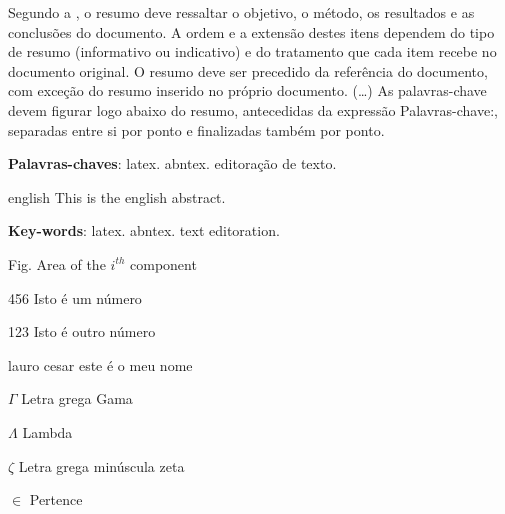 \documentclass[12pt,oneside,a4paper,english,french,spanish,brazil,]{abntex2}
\begin{document}
\frenchspacing 

\imprimircapa
\imprimirfolhaderosto


\begin{resumo}
 Segundo a \citet[3.1-3.2]{NBR6028:2003}, o resumo deve ressaltar o
 objetivo, o método, os resultados e as conclusões do documento. A ordem e a extensão
 destes itens dependem do tipo de resumo (informativo ou indicativo) e do
 tratamento que cada item recebe no documento original. O resumo deve ser
 precedido da referência do documento, com exceção do resumo inserido no
 próprio documento. (\ldots) As palavras-chave devem figurar logo abaixo do
 resumo, antecedidas da expressão Palavras-chave:, separadas entre si por
 ponto e finalizadas também por ponto.

 \vspace{\onelineskip}
    
 \noindent
 \textbf{Palavras-chaves}: latex. abntex. editoração de texto.
\end{resumo}

\begin{resumo}[Abstract]
 \begin{otherlanguage*}{english}
   This is the english abstract.

   \vspace{\onelineskip}
 
   \noindent 
   \textbf{Key-words}: latex. abntex. text editoration.
 \end{otherlanguage*}
\end{resumo}

\listoffigures*
\cleardoublepage
{}
\listoftables*
\cleardoublepage
\begin{siglas}
  \item[Fig.] Area of the $i^{th}$ component
  \item[456] Isto é um número
  \item[123] Isto é outro número
  \item[lauro cesar] este é o meu nome
\end{siglas}
\begin{simbolos}
  \item[$ \Gamma $] Letra grega Gama
  \item[$ \Lambda $] Lambda
  \item[$ \zeta $] Letra grega minúscula zeta
  \item[$ \in $] Pertence
\end{simbolos}
\tableofcontents*
\cleardoublepage
\textual
\end{document}
